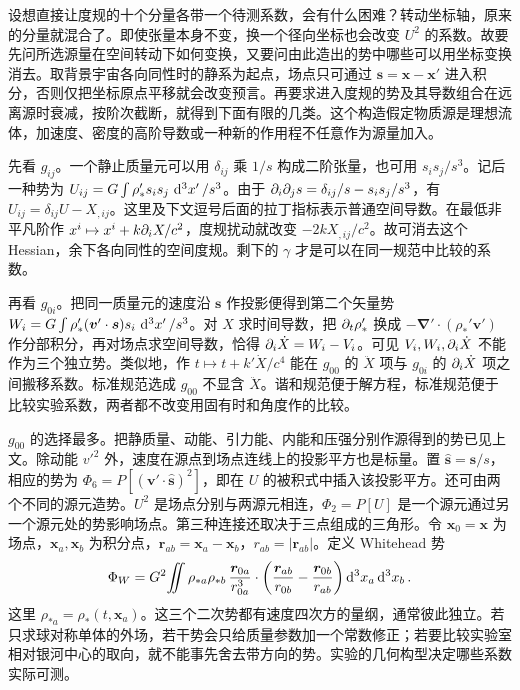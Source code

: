 设想直接让度规的十个分量各带一个待测系数，会有什么困难？转动坐标轴，原来的分量就混合了。即使张量本身不变，换一个径向坐标也会改变 $U^2$ 的系数。故要先问所选源量在空间转动下如何变换，又要问由此造出的势中哪些可以用坐标变换消去。取背景宇宙各向同性时的静系为起点，场点只可通过 $\bm s=\bm x-\bm x'$ 进入积分，否则仅把坐标原点平移就会改变预言。再要求进入度规的势及其导数组合在远离源时衰减，按阶次截断，就得到下面有限的几类。这个构造假定物质源是理想流体，加速度、密度的高阶导数或一种新的作用程不任意作为源量加入。

先看 $g_{ij}$。一个静止质量元可以用 $\delta_{ij}$ 乘 $1/s$ 构成二阶张量，也可用 $s_i s_j/s^3$。记后一种势为 $U_{ij}=G\int \rho_*'s_i s_j\,\dd[3]{x'}/s^3$。由于 $\partial_i\partial_j s=\delta_{ij}/s-s_i s_j/s^3$，有 $U_{ij}=\delta_{ij}U-X_{,ij}$。这里及下文逗号后面的拉丁指标表示普通空间导数。在最低非平凡阶作 $x^i\mapsto x^i+k\partial_iX/c^2$，度规扰动就改变 $-2kX_{,ij}/c^2$。故可消去这个 Hessian，余下各向同性的空间度规。剩下的 $\gamma$ 才是可以在同一规范中比较的系数。

再看 $g_{0i}$。把同一质量元的速度沿 $\bm s$ 作投影便得到第二个矢量势 $W_i=G\int\rho_*'(\bm v'\cdot\bm s)s_i\,\dd[3]{x'}/s^3$。对 $X$ 求时间导数，把 $\partial_t\rho_*'$ 换成 $-\bm\nabla'\cdot(\rho_*'\bm v')$ 作分部积分，再对场点求空间导数，恰得 $\partial_i\dot X=W_i-V_i$。可见 $V_i,W_i,\partial_i\dot X$ 不能作为三个独立势。类似地，作 $t\mapsto t+k'\dot X/c^4$ 能在 $g_{00}$ 的 $\ddot X$ 项与 $g_{0i}$ 的 $\partial_i\dot X$ 项之间搬移系数。标准规范选成 $g_{00}$ 不显含 $\ddot X$。谐和规范便于解方程，标准规范便于比较实验系数，两者都不改变用固有时和角度作的比较。

$g_{00}$ 的选择最多。把静质量、动能、引力能、内能和压强分别作源得到的势已见上文。除动能 $v'^2$ 外，速度在源点到场点连线上的投影平方也是标量。置 $\hat{\bm s}=\bm s/s$，相应的势为 $\Phi_6=P[(\bm v'\cdot\hat{\bm s})^2]$，即在 $U$ 的被积式中插入该投影平方。还可由两个不同的源元造势。$U^2$ 是场点分别与两源元相连，$\Phi_2=P[U]$ 是一个源元通过另一个源元处的势影响场点。第三种连接还取决于三点组成的三角形。令 $\bm x_0=\bm x$ 为场点，$\bm x_a,\bm x_b$ 为积分点，$\bm r_{ab}=\bm x_a-\bm x_b$，$r_{ab}=|\bm r_{ab}|$。定义 Whitehead 势
\begin{equation}
 \Phi_W=G^2\!\iint\rho_{*a}\rho_{*b}\,
 \frac{\bm r_{0a}}{r_{0a}^3}\cdot
 \left(\frac{\bm r_{ab}}{r_{0b}}-\frac{\bm r_{0b}}{r_{ab}}\right)
 \dd[3]{x_a}\dd[3]{x_b} .\label{eq:exp-whitehead}
\end{equation}
这里 $\rho_{*a}=\rho_*(t,\bm x_a)$。这三个二次势都有速度四次方的量纲，通常彼此独立。若只求球对称单体的外场，若干势会只给质量参数加一个常数修正；若要比较实验室相对银河中心的取向，就不能事先舍去带方向的势。实验的几何构型决定哪些系数实际可测。

